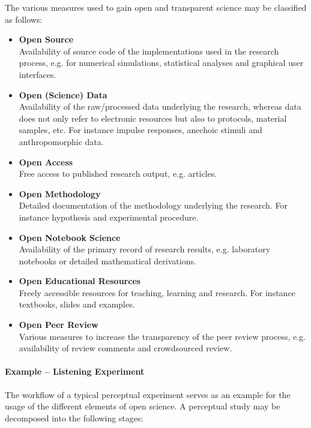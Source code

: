 \documentclass[a4paper, 10pt, twocolumn]{article}
\begin{document}
The various measures used to gain open and transparent science may be classified as
follows:
\begin{itemize}
\item \textbf{Open Source}\\
Availability of source code of the implementations used in the research process, e.g. 
for numerical simulations, statistical analyses and graphical user interfaces.
%
\item \textbf{Open (Science) Data}\\
Availability of the raw/processed data underlying the research, whereas data does not only refer 
to electronic resources but also to protocols, material samples, etc. For instance
impulse responses, anechoic stimuli and anthropomorphic data.
%
\item \textbf{Open Access}\\
Free access to published research output, e.g. articles.
%
\item \textbf{Open Methodology}\\
Detailed documentation of the methodology underlying the research. For instance hypothesis 
and experimental procedure.
%
\item \textbf{Open Notebook Science}\\
Availability of the primary record of research results, e.g. laboratory notebooks or 
detailed mathematical derivations.
%
\item \textbf{Open Educational Resources}\\
Freely accessible resources for teaching, learning and research. For instance textbooks, slides and
examples.
%
\item \textbf{Open Peer Review}~\cite{Ford13:LFP}\\
Various measures to increase the transparency of the peer review process, e.g. availability of 
review comments and crowdsourced review.
\end{itemize}


\paragraph*{Example -- Listening Experiment}

The workflow of a typical perceptual experiment serves as an example for the usage of 
the different elements of open science. A perceptual study may be decomposed into the
following stages:
\end{document}
